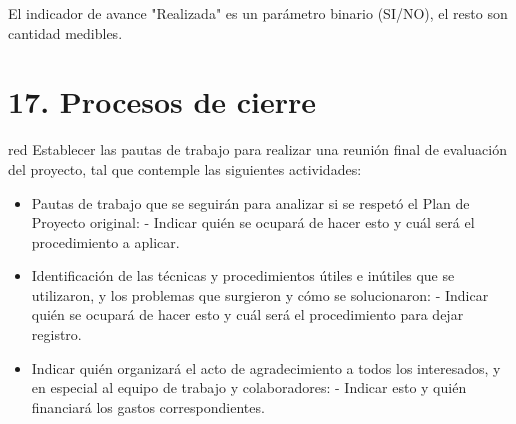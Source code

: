 \documentclass[11pt]{charter}
\begin{document}
El indicador de avance "Realizada" es un parámetro binario (SI/NO), el resto son cantidad medibles.
	
\pagebreak
\section{17. Procesos de cierre}    
\label{sec:cierre}

\begin{consigna}{red}
Establecer las pautas de trabajo para realizar una reunión final de evaluación del proyecto, tal que contemple las siguientes actividades:

\begin{itemize}
\item Pautas de trabajo que se seguirán para analizar si se respetó el Plan de Proyecto original:
 - Indicar quién se ocupará de hacer esto y cuál será el procedimiento a aplicar. 
\item Identificación de las técnicas y procedimientos útiles e inútiles que se utilizaron, y los problemas que surgieron y cómo se solucionaron:
 - Indicar quién se ocupará de hacer esto y cuál será el procedimiento para dejar registro.
\item Indicar quién organizará el acto de agradecimiento a todos los interesados, y en especial al equipo de trabajo y colaboradores:
  - Indicar esto y quién financiará los gastos correspondientes.
\end{itemize}

\end{consigna}
\end{document}
